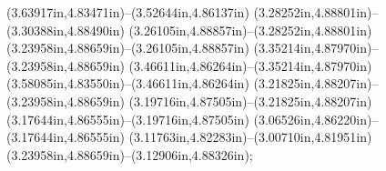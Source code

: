 (3.63917in,4.83471in)--(3.52644in,4.86137in) (3.28252in,4.88801in)--(3.30388in,4.88490in) (3.26105in,4.88857in)--(3.28252in,4.88801in) (3.23958in,4.88659in)--(3.26105in,4.88857in) (3.35214in,4.87970in)--(3.23958in,4.88659in) (3.46611in,4.86264in)--(3.35214in,4.87970in) (3.58085in,4.83550in)--(3.46611in,4.86264in) (3.21825in,4.88207in)--(3.23958in,4.88659in) (3.19716in,4.87505in)--(3.21825in,4.88207in) (3.17644in,4.86555in)--(3.19716in,4.87505in) (3.06526in,4.86220in)--(3.17644in,4.86555in) (3.11763in,4.82283in)--(3.00710in,4.81951in) (3.23958in,4.88659in)--(3.12906in,4.88326in);
